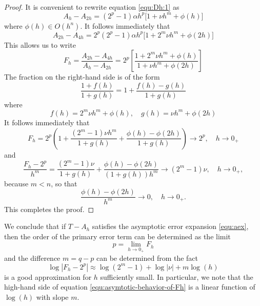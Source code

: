 \documentclass[runningheads]{llncs}
\begin{document}
\begin{proof} It is convenient to rewrite equation \eqref{equ:Dh:1} as
  \begin{equation}
    A_h - A_{2h} = (2^p-1) \alpha h^p \Big [ 1  + \nu h^m + \phi(h) \Big]
  \end{equation}
  where $\phi(h) \in O(h^n)$. It follows immediately that
   \begin{equation}
      A_{2h} - A_{4h} = 2^p (2^p-1) \alpha h^p \Big[ 1 + 2^m \nu h^m + \phi(2h) \Big]
  \end{equation}
  This allows us to write
  \begin{equation}
    F_h = \frac{ A_{2h} - A_{4h}}{ A_h - A_{2h}} = 2^p \left[ \frac{ 1 + 2^m \nu h^m + \phi(h)}{ 1  + \nu h^m + \phi(2h)} \right]
  \end{equation}
  The fraction on the right-hand side is of the form
  \begin{equation}
    \frac{1 + f(h)}{1 + g(h)} = 1 + \frac{f(h) - g(h)}{1 + g(h)}
  \end{equation}
  where
  \begin{equation}
    f(h) = 2^m \nu h^m + \phi(h), \quad g(h) = \nu h^m + \phi(2h)
  \end{equation}
  It follows immediately that
  \begin{equation}
    F_h = 2^p \left( 1 + \frac{(2^m-1)\nu h^m}{1+g(h)} + \frac{\phi(h) - \phi(2h)}{1+g(h)}\right) \rightarrow 2^p, \quad h \rightarrow 0_+
  \end{equation}
  and
  \begin{equation}
    \frac{F_h - 2^p}{h^m}  = \frac{(2^m-1)\nu }{1+g(h)} + \frac{\phi(h) - \phi(2h)}{(1+g(h))h^m} \rightarrow (2^m - 1) \nu, \quad h \rightarrow 0_+,
  \end{equation}
  because $m < n$, so that
  \begin{equation}
     \frac{\phi(h) - \phi(2h)}{h^m} \rightarrow 0, \quad h \rightarrow 0_+.
  \end{equation}
  This completes the proof.
\end{proof}
We conclude that if $T-A_h$ satisfies the asymptotic error expansion \eqref{equ:aex}, then the order of the primary error term can be determined as the limit
\begin{equation}
p = \underset{h \rightarrow 0_+}{\lim} F_h
\end{equation}
and the difference $m = q-p$ can be determined from the fact
\begin{equation} \label{equ:asymtotic-behavior-of-Fh}
  \log |F_h - 2^p| \approx \log(2^m-1) + \log|\nu| + m \log(h)
\end{equation}
is a good approximation for $h$ sufficiently small. In particular, we note that the high-hand side of equation \ref{equ:asymtotic-behavior-of-Fh} is a linear function of $\log(h)$ with slope $m$.
\end{document}
